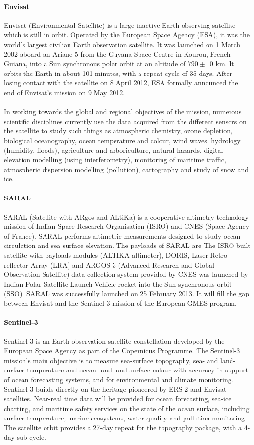  \paragraph{Envisat}
Envisat (Environmental Satellite) is a large inactive Earth-observing satellite which is still in orbit. Operated by the European Space Agency (ESA), it was the world's largest civilian Earth observation satellite. It was launched on 1 March 2002 aboard an Ariane 5 from the Guyana Space Centre in Kourou, French Guiana, into a Sun synchronous polar orbit at an altitude of $790 \pm 10$ km. It orbits the Earth in about 101 minutes, with a repeat cycle of 35 days. After losing contact with the satellite on 8 April 2012, ESA formally announced the end of Envisat's mission on 9 May 2012.\\\\
In working towards the global and regional objectives of the mission, numerous scientific disciplines currently use the data acquired from the different sensors on the satellite to study such things as atmospheric chemistry, ozone depletion, biological oceanography, ocean temperature and colour, wind waves, hydrology (humidity, floods), agriculture and arboriculture, natural hazards, digital elevation modelling (using interferometry), monitoring of maritime traffic, atmospheric dispersion modelling (pollution), cartography and study of snow and ice.
\paragraph{SARAL}
SARAL (Satellite with ARgos and ALtiKa) is a cooperative altimetry technology mission of Indian Space Research Organisation (ISRO) and CNES (Space Agency of France). SARAL performs altimetric measurements designed to study ocean circulation and sea surface elevation. The payloads of SARAL are The ISRO built satellite with payloads modules (ALTIKA altimeter), DORIS, Laser Retro-reflector Array (LRA) and ARGOS-3 (Advanced Research and Global Observation Satellite) data collection system provided by CNES was launched by Indian Polar Satellite Launch Vehicle rocket into the Sun-synchronous orbit (SSO). SARAL was successfully launched on 25 February 2013. It will fill the gap between Envisat and the Sentinel 3 mission of the European GMES program.
\paragraph{Sentinel-3}
Sentinel-3 is an Earth observation satellite constellation developed by the European Space Agency as part of the Copernicus Programme. The Sentinel-3 mission's main objective is to measure sea-surface topography, sea- and land-surface temperature and ocean- and land-surface colour with accuracy in support of ocean forecasting systems, and for environmental and climate monitoring. Sentinel-3 builds directly on the heritage pioneered by ERS-2 and Envisat satellites. Near-real time data will be provided for ocean forecasting, sea-ice charting, and maritime safety services on the state of the ocean surface, including surface temperature, marine ecosystems, water quality and pollution monitoring. The satellite orbit provides a 27-day repeat for the topography package, with a 4-day sub-cycle.
\clearpage
